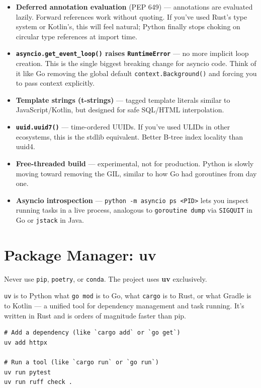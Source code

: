 \documentclass[11pt,a4paper,oneside]{book}
\newcommand{\py}[1]{\texttt{\color{pyblue}#1}}
\newcommand{\gocode}[1]{\texttt{\color{goblue}#1}}
\newcommand{\rustcode}[1]{\texttt{\color{BrickRed}#1}}
\begin{document}
\begin{itemize}
    \item \textbf{Deferred annotation evaluation} (PEP 649) --- annotations are evaluated lazily.
          Forward references work without quoting. If you've used Rust's type system or Kotlin's,
          this will feel natural; Python finally stops choking on circular type references at import time.
    \item \textbf{\py{asyncio.get\_event\_loop()} raises \py{RuntimeError}} --- no more implicit loop
          creation. This is the single biggest breaking change for asyncio code. Think of it like Go
          removing the global default \gocode{context.Background()} and forcing you to pass context explicitly.
    \item \textbf{Template strings (t-strings)} --- tagged template literals similar to JavaScript/Kotlin,
          but designed for safe SQL/HTML interpolation.
    \item \textbf{\py{uuid.uuid7()}} --- time-ordered UUIDs. If you've used ULIDs in other ecosystems,
          this is the stdlib equivalent. Better B-tree index locality than uuid4.
    \item \textbf{Free-threaded build} --- experimental, not for production. Python is slowly moving
          toward removing the GIL, similar to how Go had goroutines from day one.
    \item \textbf{Asyncio introspection} --- \texttt{python -m asyncio ps <PID>} lets you inspect
          running tasks in a live process, analogous to \texttt{goroutine dump} via \texttt{SIGQUIT}
          in Go or \texttt{jstack} in Java.
\end{itemize}

\section{Package Manager: uv}

\begin{dangerbox}
Never use \texttt{pip}, \texttt{poetry}, or \texttt{conda}. The project uses \textbf{uv} exclusively.
\end{dangerbox}

\py{uv} is to Python what \gocode{go mod} is to Go, what \rustcode{cargo} is to Rust, or what
Gradle is to Kotlin --- a unified tool for dependency management and task running. It's written in
Rust and is orders of magnitude faster than pip.

\begin{lstlisting}[style=shell]
# Add a dependency (like `cargo add` or `go get`)
uv add httpx

# Run a tool (like `cargo run` or `go run`)
uv run pytest
uv run ruff check .
\end{lstlisting}
\end{document}
